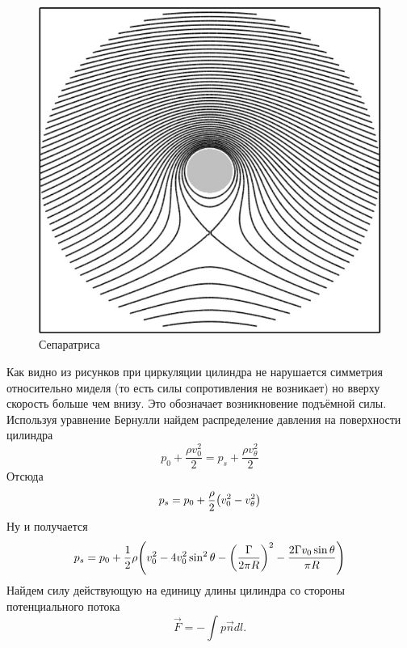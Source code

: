 \begin{figure}[H]
    \centering
    \includegraphics[scale=0.4]{photo/obtekaniecilindra4}
    \caption{Сепаратриса}
    \label{fig:figure1}
\end{figure}

Как видно из рисунков при циркуляции цилиндра не нарушается
симметрия относительно миделя (то есть силы сопротивления не
возникает) но вверху скорость больше чем внизу. Это обозначает
возникновение подъёмной силы.
Используя уравнение Бернулли найдем распределение давления на
поверхности цилиндра
\begin{equation}
	p_0+\frac{\rho v_0^2}{2}=p_s+\frac{\rho v_\theta^2}{2}
\end{equation}
Отсюда
\begin{equation}
	p_s=p_0+\frac{\rho}{2}\qty(v_0^2-v_\theta^2)
\end{equation}
Ну и получается
\begin{equation}
	p_s=p_0+\frac12\rho\qty(v_0^2-4v_0^2\sin^2\theta-\qty(\frac{\Gamma}{2\pi R})^2-\frac{2\Gamma v_0\sin\theta}{\pi R})
\end{equation}
Найдем силу действующую на единицу длины цилиндра со стороны
потенциального потока
\begin{equation}
	\vec{F}=-\int p\vec{n}dl.
\end{equation}

